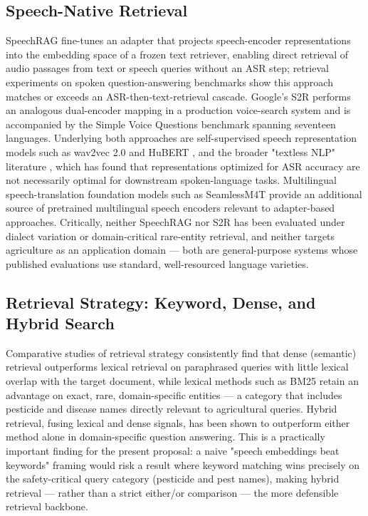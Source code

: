 \documentclass[conference]{IEEEtran}
\begin{document}
\subsection{Speech-Native Retrieval}

SpeechRAG \cite{min2025speechrag} fine-tunes an adapter that projects speech-encoder representations into the embedding space of a frozen text retriever, enabling direct retrieval of audio passages from text or speech queries without an ASR step; retrieval experiments on spoken question-answering benchmarks show this approach matches or exceeds an ASR-then-text-retrieval cascade. Google's S2R \cite{google2025s2r} performs an analogous dual-encoder mapping in a production voice-search system and is accompanied by the Simple Voice Questions benchmark spanning seventeen languages. Underlying both approaches are self-supervised speech representation models such as wav2vec 2.0 \cite{baevski2020wav2vec} and HuBERT \cite{hsu2021hubert}, and the broader "textless NLP" literature \cite{spidr2025}, which has found that representations optimized for ASR accuracy are not necessarily optimal for downstream spoken-language tasks. Multilingual speech-translation foundation models such as SeamlessM4T \cite{barrault2023seamlessm4t} provide an additional source of pretrained multilingual speech encoders relevant to adapter-based approaches. Critically, neither SpeechRAG nor S2R has been evaluated under dialect variation or domain-critical rare-entity retrieval, and neither targets agriculture as an application domain — both are general-purpose systems whose published evaluations use standard, well-resourced language varieties.

\subsection{Retrieval Strategy: Keyword, Dense, and Hybrid Search}

Comparative studies of retrieval strategy \cite{sultania2024hybridsearch} consistently find that dense (semantic) retrieval outperforms lexical retrieval on paraphrased queries with little lexical overlap with the target document, while lexical methods such as BM25 retain an advantage on exact, rare, domain-specific entities — a category that includes pesticide and disease names directly relevant to agricultural queries. Hybrid retrieval, fusing lexical and dense signals, has been shown to outperform either method alone in domain-specific question answering. This is a practically important finding for the present proposal: a naive "speech embeddings beat keywords" framing would risk a result where keyword matching wins precisely on the safety-critical query category (pesticide and pest names), making hybrid retrieval — rather than a strict either/or comparison — the more defensible retrieval backbone.
\end{document}
